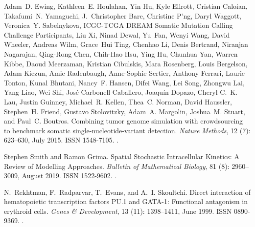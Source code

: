 \documentclass[10pt, a4paper]{article}
\begin{document}
\begin{thebibliography}{59}
	Adam~D. Ewing, Kathleen~E. Houlahan, Yin Hu, Kyle Ellrott, Cristian Caloian,
	Takafumi~N. Yamaguchi, J.~Christopher Bare, Christine P'ng, Daryl Waggott,
	Veronica~Y. Sabelnykova, {ICGC-TCGA DREAM Somatic Mutation Calling Challenge
		Participants}, Liu Xi, Ninad Dewal, Yu~Fan, Wenyi Wang, David Wheeler,
	Andreas Wilm, Grace~Hui Ting, Chenhao Li, Denis Bertrand, Niranjan Nagarajan,
	Qing-Rong Chen, Chih-Hao Hsu, Ying Hu, Chunhua Yan, Warren Kibbe, Daoud
	Meerzaman, Kristian Cibulskis, Mara Rosenberg, Louis Bergelson, Adam Kiezun,
	Amie Radenbaugh, Anne-Sophie Sertier, Anthony Ferrari, Laurie Tonton, Kunal
	Bhutani, Nancy~F. Hansen, Difei Wang, Lei Song, Zhongwu Lai, Yang Liao, Wei
	Shi, Jos{\'e} {Carbonell-Caballero}, Joaqu{\'i}n Dopazo, Cheryl C.~K. Lau,
	Justin Guinney, Michael~R. Kellen, Thea~C. Norman, David Haussler, Stephen~H.
	Friend, Gustavo Stolovitzky, Adam~A. Margolin, Joshua~M. Stuart, and Paul~C.
	Boutros.
	\newblock Combining tumor genome simulation with crowdsourcing to benchmark
	somatic single-nucleotide-variant detection.
	\newblock \emph{Nature Methods}, 12 (7): 623--630, July 2015.
	\newblock ISSN 1548-7105.
	\newblock {}.
	
	Stephen Smith and Ramon Grima.
	\newblock Spatial {{Stochastic Intracellular Kinetics}}: {{A Review}} of
	{{Modelling Approaches}}.
	\newblock \emph{Bulletin of Mathematical Biology}, 81 (8):
	2960--3009, August 2019.
	\newblock ISSN 1522-9602.
	\newblock {}.
	
	N.~Rekhtman, F.~Radparvar, T.~Evans, and A.~I. Skoultchi.
	\newblock Direct interaction of hematopoietic transcription factors {{PU}}.1
	and {{GATA}}-1: Functional antagonism in erythroid cells.
	\newblock \emph{Genes \& Development}, 13 (11): 1398--1411,
	June 1999.
	\newblock ISSN 0890-9369.
	\newblock {}.
	

\end{thebibliography}
\end{document}
